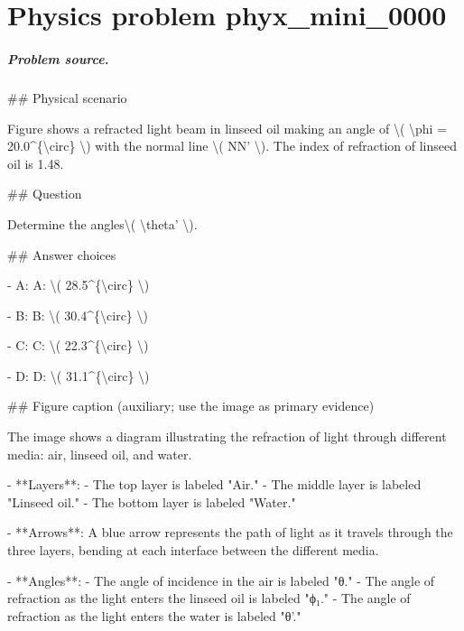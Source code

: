 
\chapter{Physics problem phyx\_mini\_0000}
\label{ch:PhyXMiniProblems_problem_phyx_mini_0000}

\paragraph{Problem source.}
\#\# Physical scenario

Figure shows a refracted light beam in linseed oil making an angle of \textbackslash{}( \textbackslash{}phi = 20.0\textasciicircum{}\{\textbackslash{}circ\} \textbackslash{}) with the normal line \textbackslash{}( NN' \textbackslash{}). The index of refraction of linseed oil is 1.48.

\#\# Question

Determine the angles\textbackslash{}( \textbackslash{}theta' \textbackslash{}).

\#\# Answer choices

- A: A: \textbackslash{}( 28.5\textasciicircum{}\{\textbackslash{}circ\} \textbackslash{})

- B: B: \textbackslash{}(  30.4\textasciicircum{}\{\textbackslash{}circ\} \textbackslash{})

- C: C: \textbackslash{}( 22.3\textasciicircum{}\{\textbackslash{}circ\} \textbackslash{})

- D: D: \textbackslash{}( 31.1\textasciicircum{}\{\textbackslash{}circ\} \textbackslash{})

\#\# Figure caption (auxiliary; use the image as primary evidence)

The image shows a diagram illustrating the refraction of light through different media: air, linseed oil, and water. 

- **Layers**: 
  - The top layer is labeled "Air."
  - The middle layer is labeled "Linseed oil."
  - The bottom layer is labeled "Water."

- **Arrows**: A blue arrow represents the path of light as it travels through the three layers, bending at each interface between the different media.

- **Angles**: 
  - The angle of incidence in the air is labeled "θ."
  - The angle of refraction as the light enters the linseed oil is labeled "ϕ₁."
  - The angle of refraction as the light enters the water is labeled "θ'."

